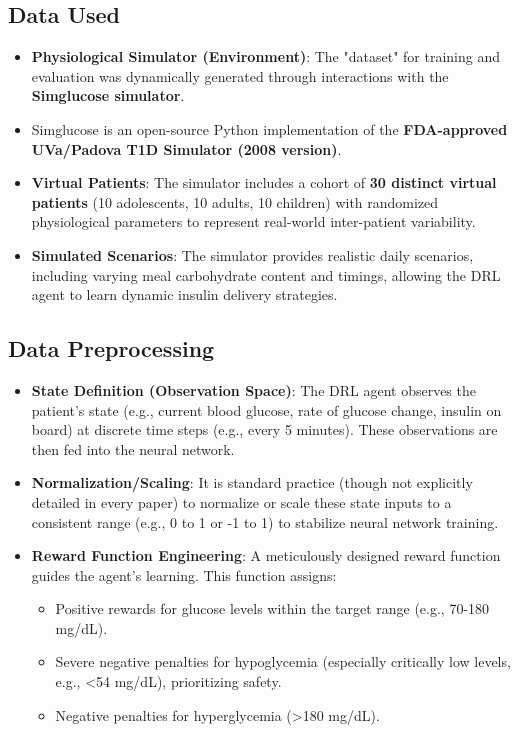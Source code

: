 \subsection*{Data Used}
\begin{itemize}
    \item \textbf{Physiological Simulator (Environment)}: The "dataset" for training and evaluation was dynamically generated through interactions with the \textbf{Simglucose simulator}.
    \item Simglucose is an open-source Python implementation of the \textbf{FDA-approved UVa/Padova T1D Simulator (2008 version)}.
    \item \textbf{Virtual Patients}: The simulator includes a cohort of \textbf{30 distinct virtual patients} (10 adolescents, 10 adults, 10 children) with randomized physiological parameters to represent real-world inter-patient variability.
    \item \textbf{Simulated Scenarios}: The simulator provides realistic daily scenarios, including varying meal carbohydrate content and timings, allowing the DRL agent to learn dynamic insulin delivery strategies.
\end{itemize}

\subsection*{Data Preprocessing}
\begin{itemize}
    \item \textbf{State Definition (Observation Space)}: The DRL agent observes the patient's state (e.g., current blood glucose, rate of glucose change, insulin on board) at discrete time steps (e.g., every 5 minutes). These observations are then fed into the neural network.
    \item \textbf{Normalization/Scaling}: It is standard practice (though not explicitly detailed in every paper) to normalize or scale these state inputs to a consistent range (e.g., 0 to 1 or -1 to 1) to stabilize neural network training.
    \item \textbf{Reward Function Engineering}: A meticulously designed reward function guides the agent's learning. This function assigns:
    \begin{itemize}
        \item Positive rewards for glucose levels within the target range (e.g., 70-180 mg/dL).
        \item Severe negative penalties for hypoglycemia (especially critically low levels, e.g., <54 mg/dL), prioritizing safety.
        \item Negative penalties for hyperglycemia (>180 mg/dL).
    \end{itemize}
\end{itemize}

